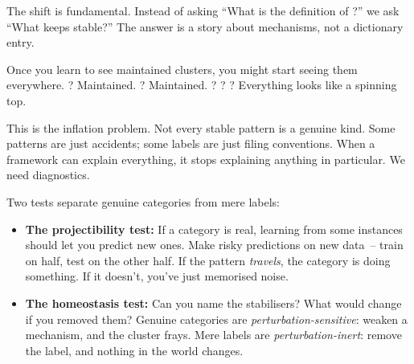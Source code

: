 The shift is fundamental. Instead of asking \enquote{What is the definition of ?} we ask \enquote{What keeps  stable?} The answer is a story about mechanisms, not a dictionary entry.

\bigskip

Once you learn to see maintained clusters, you might start seeing them everywhere. ? Maintained. ? Maintained. ? ? ? Everything looks like a spinning top.

This is the inflation problem. Not every stable pattern is a genuine kind. Some patterns are just accidents; some labels are just filing conventions. When a framework can explain everything, it stops explaining anything in particular. We need diagnostics.

Two tests separate genuine categories from mere labels:
\begin{itemize}
    \item \textbf{The projectibility test:} If a category is real, learning from some instances should let you predict new ones. Make risky predictions on new data~-- train on half, test on the other half. If the pattern \emph{travels}, the category is doing something. If it doesn't, you've just memorised noise.
    \item \textbf{The homeostasis test:} Can you name the stabilisers? What would change if you removed them? Genuine categories are \emph{perturbation-sensitive}: weaken a mechanism, and the cluster frays. Mere labels are \emph{perturbation-inert}: remove the label, and nothing in the world changes.
\end{itemize}

